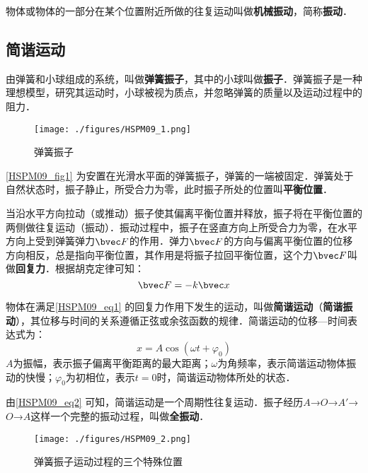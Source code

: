 
\begin{issues}
\issueDraft
\issueTODO
\end{issues}

物体或物体的一部分在某个位置附近所做的往复运动叫做\textbf{机械振动}，简称\textbf{振动}．

\subsection{简谐运动}

由弹簧和小球组成的系统，叫做\textbf{弹簧振子}，其中的小球叫做\textbf{振子}．弹簧振子是一种理想模型，研究其运动时，小球被视为质点，并忽略弹簧的质量以及运动过程中的阻力．

\begin{figure}[ht]
\centering
\texttt{[image: ./figures/HSPM09\_1.png]}
\caption{弹簧振子} \label{HSPM09_fig1}
\end{figure}

\autoref{HSPM09_fig1} 为安置在光滑水平面的弹簧振子，弹簧的一端被固定．弹簧处于自然状态时，振子静止，所受合力为零，此时振子所处的位置叫\textbf{平衡位置}．

当沿水平方向拉动（或推动）振子使其偏离平衡位置并释放，振子将在平衡位置的两侧做往复运动（振动）．振动过程中，振子在竖直方向上所受合力为零，在水平方向上受到弹簧弹力$\bvec F$的作用．弹力$\bvec F$的方向与偏离平衡位置的位移方向相反，总是指向平衡位置，其作用是将振子拉回平衡位置，这个力$\bvec F$叫做\textbf{回复力}．根据胡克定律可知：
\begin{equation}\label{HSPM09_eq1}
\bvec F=-k\bvec x
\end{equation}

物体在满足\autoref{HSPM09_eq1} 的回复力作用下发生的运动，叫做\textbf{简谐运动}（\textbf{简谐振动}），其位移与时间的关系遵循正弦或余弦函数的规律．简谐运动的位移—时间表达式为：
\begin{equation}\label{HSPM09_eq2}
x=A\cos(\omega t + \varphi_0)
\end{equation}
$A$为振幅，表示振子偏离平衡距离的最大距离；$\omega$为角频率，表示简谐运动物体振动的快慢；$\varphi_0$为初相位，表示$t=0$时，简谐运动物体所处的状态．

由\autoref{HSPM09_eq2} 可知，简谐运动是一个周期性往复运动．振子经历$A$→$O$→$A'$→$O$→$A$这样一个完整的振动过程，叫做\textbf{全振动}．

\begin{figure}[ht]
\centering
\texttt{[image: ./figures/HSPM09\_2.png]}
\caption{弹簧振子运动过程的三个特殊位置} \label{HSPM09_fig2}
\end{figure}